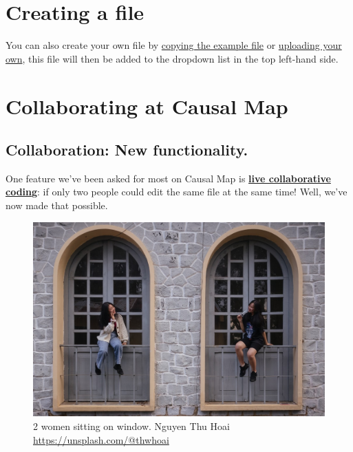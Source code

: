 \documentclass[
]{book}
\begin{document}
\hypertarget{creating-a-file}{%
\chapter{Creating a file}\label{creating-a-file}}

You can also create your own file by \protect\hyperlink{xown-copy}{copying the example file} or \protect\hyperlink{ximport}{uploading your own}, this file will then be added to the dropdown list in the top left-hand side.

\hypertarget{collaboratio}{%
\chapter{Collaborating at Causal Map}\label{collaboratio}}

\hypertarget{collaboration-new-functionality.}{%
\section{Collaboration: New functionality.}\label{collaboration-new-functionality.}}

One feature we've been asked for most on Causal Map is \textbf{\href{https://guide.causalmap.app/collaborating-at-causal-map.html\#details}{live collaborative coding}}: if only two people could edit the same file at the same time! Well, we've now made that possible.

\begin{figure}
\centering
\includegraphics[width=6.77083in,height=\textheight]{_assets/photo-1580408377065-1da9909a26baixlib=rb-1.2.jpeg}
\caption{2 women sitting on window. Nguyen Thu Hoai \url{https://unsplash.com/@thwhoai}}
\end{figure}
\end{document}
